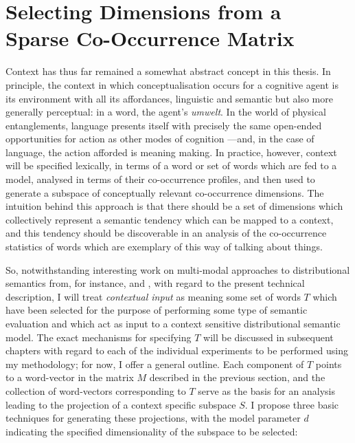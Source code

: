 \section{Selecting Dimensions from a Sparse Co-Occurrence Matrix} \label{sec:project}
Context has thus far remained a somewhat abstract concept in this thesis.  In principle, the context in which conceptualisation occurs for a cognitive agent is its environment with all its affordances, linguistic and semantic but also more generally perceptual: in a word, the agent's \emph{umwelt}.  In the world of physical entanglements, language presents itself with precisely the same open-ended opportunities for action as other modes of cognition \citep{Gibson1979,Clark1997}---and, in the case of language, the action afforded is meaning making.  In practice, however, context will be specified lexically, in terms of a word or set of words which are fed to a model, analysed in terms of their co-occurrence profiles, and then used to generate a subspace of conceptually relevant co-occurrence dimensions.  The intuition behind this approach is that there should be a set of dimensions which collectively represent a semantic tendency which can be mapped to a context, and this tendency should be discoverable in an analysis of the co-occurrence statistics of words which are exemplary of this way of talking about things.


So, notwithstanding interesting work on multi-modal approaches to distributional semantics from, for instance, \cite{HillEA2014} and \cite{BruniEA2014}, with regard to the present technical description, I will treat \emph{contextual input} as meaning some set of words $T$ which have been selected for the purpose of performing some type of semantic evaluation and which act as input to a context sensitive distributional semantic model.  The exact mechanisms for specifying $T$ will be discussed in subsequent chapters with regard to each of the individual experiments to be performed using my methodology; for now, I offer a general outline.  Each component of $T$ points to a word-vector in the matrix $M$ described in the previous section, and the collection of word-vectors corresponding to $T$ serve as the basis for an analysis leading to the projection of a context specific subspace $S$.  I propose three basic techniques for generating these projections, with the model parameter $d$ indicating the specified dimensionality of the subspace to be selected:

